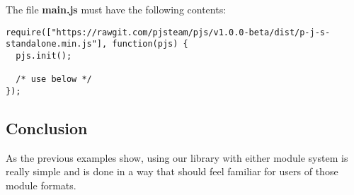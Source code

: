 The file \textbf{main.js} must have the following contents:
\begin{lstlisting}[caption=main.js AMD support]
require(["https://rawgit.com/pjsteam/pjs/v1.0.0-beta/dist/p-j-s-standalone.min.js"], function(pjs) {
  pjs.init();

  /* use below */
});
\end{lstlisting}

\subsection{Conclusion}
As the previous examples show, using our library with either module system is really simple and is done in a way that should feel familiar for users of those module formats.

\pagebreak